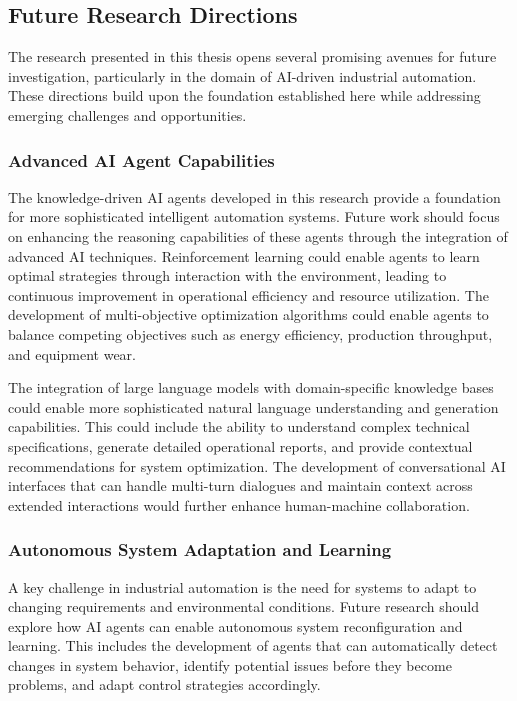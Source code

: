 \subsection{Future Research Directions}

The research presented in this thesis opens several promising avenues for future investigation, particularly in the domain of AI-driven industrial automation. These directions build upon the foundation established here while addressing emerging challenges and opportunities.

\subsubsection{Advanced AI Agent Capabilities}

The knowledge-driven AI agents developed in this research provide a foundation for more sophisticated intelligent automation systems. Future work should focus on enhancing the reasoning capabilities of these agents through the integration of advanced AI techniques. Reinforcement learning could enable agents to learn optimal strategies through interaction with the environment, leading to continuous improvement in operational efficiency and resource utilization. The development of multi-objective optimization algorithms could enable agents to balance competing objectives such as energy efficiency, production throughput, and equipment wear.

The integration of large language models with domain-specific knowledge bases could enable more sophisticated natural language understanding and generation capabilities. This could include the ability to understand complex technical specifications, generate detailed operational reports, and provide contextual recommendations for system optimization. The development of conversational AI interfaces that can handle multi-turn dialogues and maintain context across extended interactions would further enhance human-machine collaboration.

\subsubsection{Autonomous System Adaptation and Learning}

A key challenge in industrial automation is the need for systems to adapt to changing requirements and environmental conditions. Future research should explore how AI agents can enable autonomous system reconfiguration and learning. This includes the development of agents that can automatically detect changes in system behavior, identify potential issues before they become problems, and adapt control strategies accordingly.

